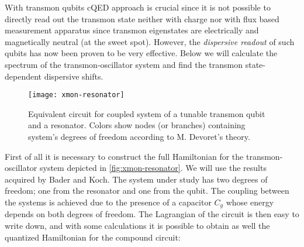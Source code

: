 \documentclass[12pt, twoside]{report}
\numberwithin{equation}{section}
\begin{document}
With transmon qubits cQED approach is crucial since it is not possible to directly read out the transmon state neither with charge nor with flux based measurement apparatus since transmon eigenstates are electrically and magnetically neutral (at the sweet spot). However, the \textit{dispersive readout}\cite{Blais2004} of such qubits has now been proven to be very effective. Below we will calculate the spectrum of the transmon-oscillator system and find the transmon state-dependent dispersive shifts.

\begin{figure}
\centering
\texttt{[image: xmon-resonator]}
\caption{Equivalent circuit for coupled system of a tunable transmon qubit and a resonator. Colors show nodes (or branches) containing system's degrees of freedom according to M. Devoret's theory\cite{Devoret1995}.}
\label{fig:xmon-resonator}
\end{figure}

First of all it is necessary to construct the full Hamiltonian for the transmon-oscillator system depicted in \autoref{fig:xmon-resonator}. We will use the results acquired by Bader\cite{Bader2013} and Koch\cite{Koch2007}. The system under study has two degrees of freedom; one from the resonator and one from the qubit. The coupling between the systems is achieved due to the presence of a capacitor $C_g$ whose energy depends on both degrees of freedom. The Lagrangian of the circuit is then easy to write down, and with some calculations it is possible to obtain as well the quantized Hamiltonian for the compound circuit:
\end{document}

